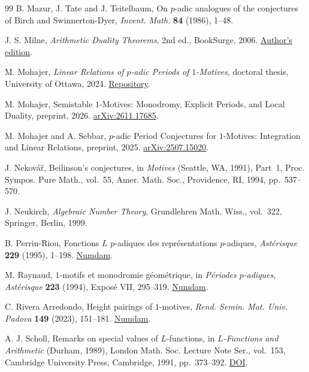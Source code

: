 \documentclass[11pt]{amsart}
\numberwithin{equation}{section}
\theoremstyle{definition}
\theoremstyle{remark}
\begin{document}
\begin{thebibliography}{99}
B. Mazur, J. Tate and J. Teitelbaum,
On $p$-adic analogues of the conjectures of Birch and Swinnerton-Dyer,
\emph{Invent. Math.} \textbf{84} (1986), 1--48.

J. S. Milne, \emph{Arithmetic Duality Theorems}, 2nd ed.,
BookSurge, 2006.
\href{https://www.jmilne.org/math/Books/adt.html}{Author's edition}.

M. Mohajer, \emph{Linear Relations of $p$-adic Periods of $1$-Motives},
doctoral thesis, University of Ottawa, 2024.
\href{https://doi.org/10.20381/ruor-30802}{Repository}.

M. Mohajer, Semistable $1$-Motives: Monodromy, Explicit Periods,
and Local Duality, preprint, 2026.
\href{https://arxiv.org/abs/2611.17685}{arXiv:2611.17685}.

M. Mohajer and A. Sebbar, $p$-adic Period Conjectures for $1$-Motives:
Integration and Linear Relations, preprint, 2025.
\href{https://arxiv.org/abs/2507.15020}{arXiv:2507.15020}.

J. Nekov\'a\v r, Beilinson's conjectures, in \emph{Motives}
(Seattle, WA, 1991), Part~1, Proc. Sympos. Pure Math., vol.~55,
Amer. Math. Soc., Providence, RI, 1994, pp.~537--570.

J. Neukirch, \emph{Algebraic Number Theory},
Grundlehren Math. Wiss., vol.~322, Springer, Berlin, 1999.

B. Perrin-Riou, Fonctions $L$ $p$-adiques des repr\'esentations
$p$-adiques, \emph{Ast\'erisque} \textbf{229} (1995), 1--198.
\href{http://www.numdam.org/item/AST_1995__229__1_0/}{Numdam}.

M. Raynaud, $1$-motifs et monodromie g\'eom\'etrique, in
\emph{P\'eriodes $p$-adiques}, \emph{Ast\'erisque} \textbf{223}
(1994), Expos\'e VII, 295--319.
\href{http://www.numdam.org/item/AST_1994__223__295_0/}{Numdam}.

C. Rivera Arredondo, Height pairings of $1$-motives,
\emph{Rend. Semin. Mat. Univ. Padova} \textbf{149} (2023), 151--181.
\href{https://www.numdam.org/item/RSMUP_2023__149__151_0/}{Numdam}.

A. J. Scholl, Remarks on special values of $L$-functions,
in \emph{$L$-Functions and Arithmetic} (Durham, 1989),
London Math. Soc. Lecture Note Ser., vol.~153, Cambridge University
Press, Cambridge, 1991, pp.~373--392.
\href{https://doi.org/10.1017/CBO9780511526053.016}{DOI}.


\end{thebibliography}
\end{document}
